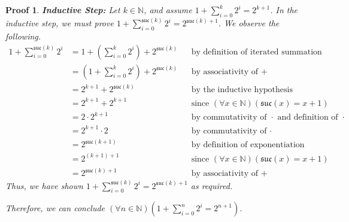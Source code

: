 \documentclass[12pt]{article}
\newcommand{\suc}{\mathfrak{suc}}
\newcommand{\N}{\mathbb{N}}
\theoremstyle{proofstyle}
\newtheorem*{proof*}{Proof}
\begin{document}
\begin{enumerate}[left=0pt, itemsep=2em, parsep=1em]
\begin{proof*}
\medskip
\textbf{Inductive Step:}
Let $k \in \N$, and assume $1 + \displaystyle\sum_{i=0}^{k} 2^i = 2^{k+1}$. In the inductive step, we must prove $1 + \displaystyle\sum_{i=0}^{\suc(k)} 2^i = 2^{\suc(k)+1}$.
We observe the following.
\begin{align*}
  1 + \sum_{i=0}^{\suc(k)} 2^i
    &= 1 + \left(\sum_{i=0}^{k} 2^i\right) + 2^{\suc(k)}
      &&\text{by definition of iterated summation} \\
    &= \left(1 + \sum_{i=0}^{k} 2^i\right) + 2^{\suc(k)}
      &&\text{by associativity of }+ \\
    &= 2^{k+1} + 2^{\suc(k)}
      &&\text{by the inductive hypothesis} \\
    &= 2^{k+1} + 2^{k+1}
      &&\text{since }(\forall x \in \N)(\suc(x) = x + 1) \\
    &= 2 \cdot 2^{k+1}
      &&\text{by commutativity of }\cdot\text{ and definition of }\cdot \\
    &= 2^{k+1} \cdot 2
      &&\text{by commutativity of }\cdot \\
    &= 2^{\suc(k+1)}
      &&\text{by definition of exponentiation} \\
    &= 2^{(k+1)+1}
      &&\text{since }(\forall x \in \N)(\suc(x) = x + 1) \\
    &= 2^{\suc(k)+1}
      &&\text{by associativity of }+
\end{align*}
Thus, we have shown $1 + \displaystyle\sum_{i=0}^{\suc(k)} 2^i = 2^{\suc(k)+1}$ as required.

Therefore, we can conclude $(\forall n \in \N)\!\left(1 + \displaystyle\sum_{i=0}^{n} 2^i = 2^{n+1}\right)$.
\end{proof*}

\end{enumerate}
\end{document}
